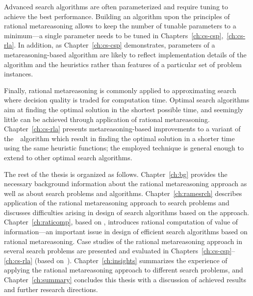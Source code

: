 Advanced search algorithms are often parameterized and require tuning
to achieve the best performance. Building an algorithm upon the
principles of rational metareasoning allows to keep the number of
tunable parameters to a minimum---a single parameter needs to be tuned
in Chapters~\ref{ch:cs-csp},~\ref{ch:cs-rla}. In addition, as
Chapter~\ref{ch:cs-csp} demonstrates, parameters
of a metareasoning-based algorithm are likely to reflect
implementation details of the algorithm and the heuristics rather
than features of a particular set of problem instances.

Finally, rational metareasoning is commonly applied to approximating
search where decision quality is traded for computation time. Optimal
search algorithms aim at finding the optimal solution in the shortest
possible time, and seemingly little can be achieved through
application of rational metareasoning.  Chapter~\ref{ch:cs-rla}
presents metareasoning-based improvements to a variant of
the~\astar~algorithm which result in finding the optimal solution in a
shorter time using the same heuristic functions; the employed
technique is general enough to extend to other optimal
search algorithms.

The rest of the thesis is organized as follows. Chapter~\ref{ch:bg}
provides the necessary background information about the rational
metareasoning approach as well as about search problems and
algorithms. Chapter~\ref{ch:ramesrch} describes application of the
rational metareasoning approach to search problems and discusses
difficulties arising in design of search algorithms based on the
approach. Chapter~\ref{ch:raticomp}, based
on \cite{TolpinShimony.raticomp}, introduces rational computation of
value of information---an important issue in design of efficient
search algorithms based on rational metareasoning. Case studies of the
rational metareasoning approach in several search problems are
presented and evaluated in Chapters~\ref{ch:cs-csp}--\ref{ch:cs-rla} (based
on~\cite{TolpinShimony.csp,TolpinShimony.mcts,HayRussellTolpinShimony.selecting,TolpinEtAl.rla}).
Chapter~\ref{ch:insights} summarizes the experience of applying 
the rational metareasoning approach to different search problems, and
Chapter~\ref{ch:summary} concludes this thesis with a discussion of
achieved results and further research directions.

